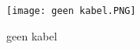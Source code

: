 \begin{figure}[H]
    \centering
    \texttt{[image: geen kabel.PNG]}
    \caption{geen kabel}
    \label{fig:geen kabel}
\end{figure}